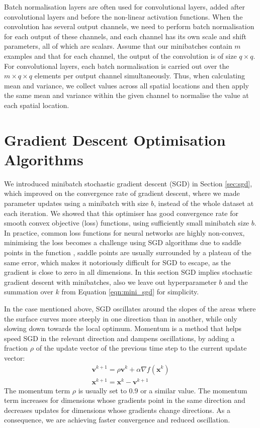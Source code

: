 \documentclass[12pt]{report}
\numberwithin{equation}{section}
\begin{document}
Batch normalisation layers are often used for convolutional layers, added after convolutional layers and before the non-linear activation functions. When the convolution has several output channels, we need to perform batch normalisation for each output of these channels, and each channel has its own scale and shift parameters, all of which are scalars. Assume that our minibatches contain $m$ examples and that for each channel, the output of the convolution is of size $q \times q$. For convolutional layers, each batch normalisation is carried out over the $m \times q \times q$ elements per output channel simultaneously. Thus, when calculating mean and variance, we collect values across all spatial locations and then apply the same mean and variance within the given channel to normalise the value at each spatial location.


\section{Gradient Descent Optimisation Algorithms}
We introduced minibatch stochastic gradient descent (SGD) in Section \ref{sec:sgd}, which improved on the convergence rate of gradient descent, where we made parameter updates using a minibatch with size $b$, instead of the whole dataset at each iteration. We showed that this optimiser has good convergence rate for smooth convex objective (loss) functions, using sufficiently small minibatch size $b$. In practice, common loss functions for neural networks are highly non-convex, minimising the loss becomes a challenge using SGD algorithms due to saddle points in the function {\cite{dauphin17e}}, saddle points are usually surrounded by a plateau of the same error, which makes it notoriously difficult for SGD to escape, as the gradient is close to zero in all dimensions. In this section SGD implies stochastic gradient descent with minibatches, also we leave out hyperparameter $b$ and the summation over $k$ from Equation \ref{eqn:mini_sgd} for simplicity.

In the case mentioned above, SGD oscillates around the slopes of the areas where the surface curves more steeply in one direction than in another, while only slowing down towards the local optimum. Momentum {\cite{qian1999momentum}} is a method that helps speed SGD in the relevant direction and dampens oscillations, by adding a fraction $\rho$ of the update vector of the previous time step to the current update vector:
\begin{equation}
\begin{array}{l}\label{eqn:momentum}
\bm{v}^{k+1}=\rho \bm{v}^{k}+ \alpha \nabla f(\bm{x}^{k}) \\
\bm{x}^{k+1} = \bm{x}^{k}- \bm{v}^{k+1}
\end{array}
\end{equation} \noindent
The momentum term $\rho$ is usually set to $0.9$ or a similar value. The momentum term increases for dimensions whose gradients point in the same direction and decreases updates for dimensions whose gradients change directions. As a consequence, we are achieving faster convergence and reduced oscillation.
\end{document}
